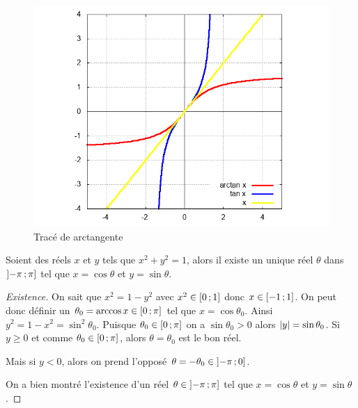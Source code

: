 \begin{figure}
  \centering
  \includegraphics[scale=0.4,angle=-90]{arctan.png}
  \caption{Tracé de arctangente}
  \label{fig:tracearctangente}
\end{figure}
%
\begin{theo}
  \label{chap1-theo:thetasin}
  Soient des réels $x$ et $y$ tels que $x^2+y^2=1$, alors il existe un unique réel $\theta$ dans $\left] -\pi \, ;  \pi \right]$ tel que $x=\cos \theta$ et $y=\sin \theta$.
\end{theo}
\begin{proof}[Existence]
  On sait que $x^2=1-y^2$ avec $x^2 \in \left[ 0 \, ;  1 \right]$ donc $x \in \left[ -1 \, ;  1 \right]$. On peut donc définir un $\theta_0=\arccos x \in \left[ 0 \, ;  \pi \right]$ tel que $x=\cos \theta_0$. Ainsi $y^2=1-x^2=\sin^2 \theta_0$. Puisque $\theta_0 \in \left[ 0 \, ;  \pi \right]$ on a $\sin \theta_0>0$ alors $\left\lvert y\right\rvert=\sin \theta_0$.
Si $y \geq 0$ et comme $\theta_0 \in \left[ 0 \, ;  \pi \right]$, alors $\theta=\theta_0$ est le bon réel.

Mais si $y<0$, alors on prend l'opposé $\theta=-\theta_0 \in \left] -\pi \, ;  0 \right]$.

On a bien montré l'existence d'un réel $\theta \in \left] -\pi \, ;  \pi \right]$ tel que $x=\cos \theta$ et $y=\sin \theta$.
\end{proof}
